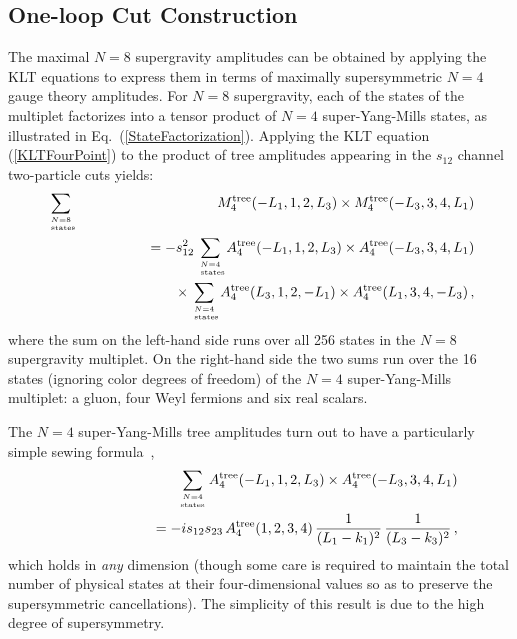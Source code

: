 \documentclass[12pt]{livrev}
\begin{document}
\subsection{One-loop Cut Construction}
\label{subsection:supergravity_cut_construction}

The maximal $N=8$ supergravity amplitudes can be obtained by applying
the KLT equations to express them in terms of maximally supersymmetric
$N=4$ gauge theory amplitudes.  For $N=8$ supergravity, each of the states
of the multiplet factorizes into a tensor product of $N=4$
super-Yang-Mills states, as illustrated in
Eq.~(\ref{StateFactorization}). Applying the KLT equation
(\ref{KLTFourPoint}) to the product of tree amplitudes appearing in
the $s_{12}$ channel two-particle cuts yields:
%
\begin{eqnarray}
\sum_{N=8 \atop \rm\ states}  
&& M_4^{\rm tree}(-L_1,  1, 2, L_3) \times
  M_4^{\rm tree}(-L_3, 3, 4, L_1) \nonumber \\
&& \hskip 1.5 cm  = 
- s_{12}^2 \!\sum_{N=4 \atop \rm\ states} \!
 A_4^{\rm tree}(-L_1,  1, 2, L_3) \times
     A_4^{\rm tree}(-L_3,  3,4 , L_1) \nonumber \\
\null & & \hskip 1.9 truecm
\times
\!\sum_{N=4 \atop \rm\ states} \!
 A_4^{\rm tree}(L_3, 1, 2 , -L_1) \times
                A_4^{\rm tree}(L_1, 3, 4, -L_3) \,,
\label{GravitySewingStart}
\end{eqnarray}
%
where the sum on the left-hand side runs over all 256 states in the
$N=8$ supergravity multiplet. On the right-hand side the two sums run
over the 16 states (ignoring color degrees of freedom) of the $N=4$
super-Yang-Mills multiplet: a gluon, four Weyl fermions and six real
scalars.

The $N=4$ super-Yang-Mills tree amplitudes turn out to have a 
particularly simple sewing formula~\cite{BRY},
%
\begin{eqnarray}
&& \sum_{N=4\atop \rm  states}
 A_4^{\rm tree}(-L_1, 1, 2, L_3) \times
  A_4^{\rm tree}(-L_3, 3, 4, L_1) \nonumber \\
%
&& \hskip 2 cm 
 =  - i s_{12} s_{23} \, A_4^{\rm tree}(1, 2, 3, 4) \, 
   {1\over (L_1 - k_1)^2 } \, 
   {1\over (L_3 - k_3)^2 } \,,
\label{YangMillsSewing}
\end{eqnarray}
%
which holds in {\it any} dimension (though some care is required to maintain
the total number of physical states at their four-dimensional values so
as to preserve the supersymmetric cancellations).
The simplicity of this result is due to the high degree of supersymmetry.
\end{document}
